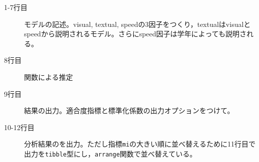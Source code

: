 \begin{description}
	\item[1-7行目] モデルの記述。visual, textual, speedの3因子をつくり，textualはvisualとspeedから説明されるモデル。さらにspeed因子は学年によっても説明される。
	\item[8行目] 関数による推定
	\item[9行目] 結果の出力。適合度指標と標準化係数の出力オプションをつけて。
	\item[10-12行目] 分析結果のを出力。ただし指標\verb|mi|の大きい順に並べ替えるために11行目で出力を\texttt{tibble}型にし，\texttt{arrange}関数で並べ替えている。
\end{description}
